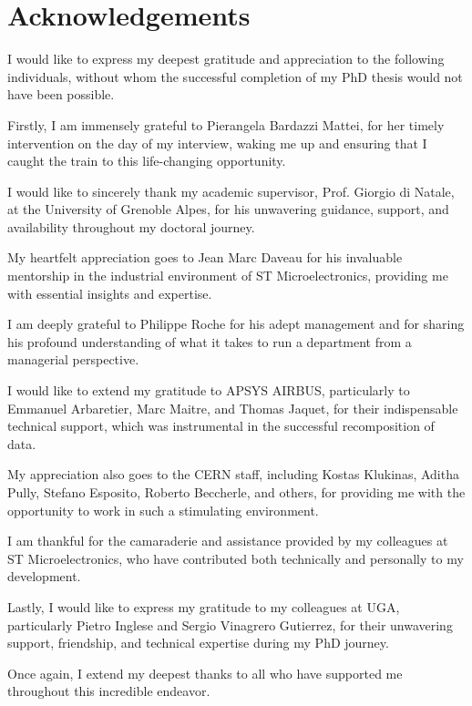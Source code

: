 \documentclass[./dissertation.tex]{subfiles}
\begin{document}
  \chapter*{Acknowledgements}

I would like to express my deepest gratitude and appreciation to the following individuals, without whom the successful completion of my PhD thesis would not have been possible.

Firstly, I am immensely grateful to Pierangela Bardazzi Mattei, for her timely intervention on the day of my interview, waking me up and ensuring that I caught the train to this life-changing opportunity.

I would like to sincerely thank my academic supervisor, Prof. Giorgio di Natale, at the University of Grenoble Alpes, for his unwavering guidance, support, and availability throughout my doctoral journey.

My heartfelt appreciation goes to Jean Marc Daveau for his invaluable mentorship in the industrial environment of ST Microelectronics, providing me with essential insights and expertise.

I am deeply grateful to Philippe Roche for his adept management and for sharing his profound understanding of what it takes to run a department from a managerial perspective.

I would like to extend my gratitude to APSYS AIRBUS, particularly to Emmanuel Arbaretier, Marc Maitre, and Thomas Jaquet, for their indispensable technical support, which was instrumental in the successful recomposition of data.

My appreciation also goes to the CERN staff, including Kostas Klukinas, Aditha Pully, Stefano Esposito, Roberto Beccherle, and others, for providing me with the opportunity to work in such a stimulating environment.

I am thankful for the camaraderie and assistance provided by my colleagues at ST Microelectronics, who have contributed both technically and personally to my development.

Lastly, I would like to express my gratitude to my colleagues at UGA, particularly Pietro Inglese and Sergio Vinagrero Gutierrez, for their unwavering support, friendship, and technical expertise during my PhD journey.

Once again, I extend my deepest thanks to all who have supported me throughout this incredible endeavor.
\end{document}
